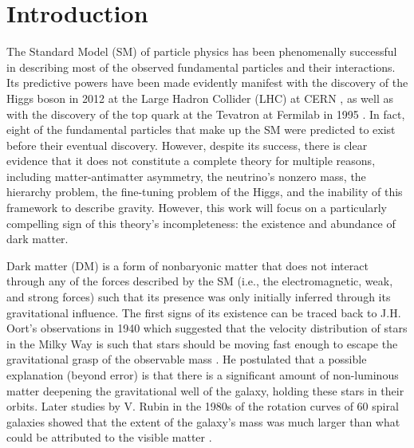 \chapter{Introduction}

The Standard Model (SM) of particle physics has been phenomenally successful in describing most of the observed fundamental particles and their interactions. Its predictive powers have been made evidently manifest with the discovery of the Higgs boson in 2012 at the Large Hadron Collider (LHC) at CERN \cite{collaborationObservationNewBoson2012}, as well as with the discovery of the top quark at the Tevatron at Fermilab in 1995 \cite{abachiObservationTopQuark1995}. In fact, eight of the fundamental particles that make up the SM were predicted to exist before their eventual discovery. However, despite its success, there is clear evidence that it does not constitute a complete theory \cite{saikumarExploringFrontiersChallenges2024,garrettDarkMatterPrimer2011} for multiple reasons, including matter-antimatter asymmetry, the neutrino's nonzero mass, the hierarchy problem, the fine-tuning problem of the Higgs, and the inability of this framework to describe gravity. However, this work will focus on a particularly compelling sign of this theory's incompleteness: the existence and abundance of dark matter.

Dark matter (DM) is a form of nonbaryonic matter that does not interact through any of the forces described by the SM (i.e., the electromagnetic, weak, and strong forces) such that its presence was only initially inferred through its gravitational influence. The first signs of its existence can be traced back to J.H. Oort's observations in 1940 which suggested that the velocity distribution of stars in the Milky Way is such that stars should be moving fast enough to escape the gravitational grasp of the observable mass \cite{oortProblemsConcerningStructure1940}. He postulated that a possible explanation (beyond error) is that there is a significant amount of non-luminous matter deepening the gravitational well of the galaxy, holding these stars in their orbits. Later studies by V. Rubin in the 1980s of the rotation curves of 60 spiral galaxies showed that the extent of the galaxy's mass was much larger than what could be attributed to the visible matter \cite{rubinDarkMatterSpiral1983}.

